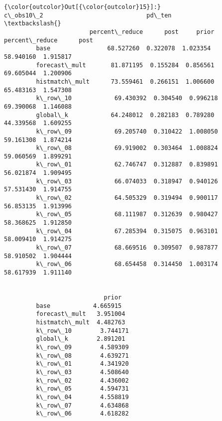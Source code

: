 \documentclass{article}
\begin{document}
            \begin{Verbatim}[commandchars=\\\{\}]
{\color{outcolor}Out[{\color{outcolor}15}]:}                     c\_obs10\_2                             pd\_ten            \textbackslash{}
                        percent\_reduce      post     prior percent\_reduce      post   
         base                68.527260  0.322078  1.023354      58.940160  1.915817   
         forecast\_mult       81.871195  0.155284  0.856561      69.605044  1.200906   
         histmatch\_mult      73.559461  0.266151  1.006600      65.483163  1.547308   
         k\_row\_10            69.430392  0.304540  0.996218      69.390068  1.146088   
         global\_k            64.248012  0.282183  0.789280      44.339568  1.609255   
         k\_row\_09            69.205740  0.310422  1.008050      59.161308  1.874214   
         k\_row\_08            69.919002  0.303464  1.008824      59.060569  1.899291   
         k\_row\_01            62.746747  0.312887  0.839891      56.021874  1.909495   
         k\_row\_03            66.074033  0.318947  0.940126      57.531430  1.914755   
         k\_row\_02            64.505329  0.319494  0.900117      56.853135  1.913996   
         k\_row\_05            68.111987  0.312639  0.980427      58.368625  1.912850   
         k\_row\_04            67.285394  0.315075  0.963101      58.009410  1.914275   
         k\_row\_07            68.669516  0.309507  0.987877      58.910502  1.904444   
         k\_row\_06            68.654458  0.314450  1.003174      58.617939  1.911140   
         
                                   
                            prior  
         base            4.665915  
         forecast\_mult   3.951004  
         histmatch\_mult  4.482763  
         k\_row\_10        3.744171  
         global\_k        2.891201  
         k\_row\_09        4.589309  
         k\_row\_08        4.639271  
         k\_row\_01        4.341920  
         k\_row\_03        4.508640  
         k\_row\_02        4.436002  
         k\_row\_05        4.594731  
         k\_row\_04        4.558819  
         k\_row\_07        4.634868  
         k\_row\_06        4.618282  
\end{Verbatim}
        
\end{document}
